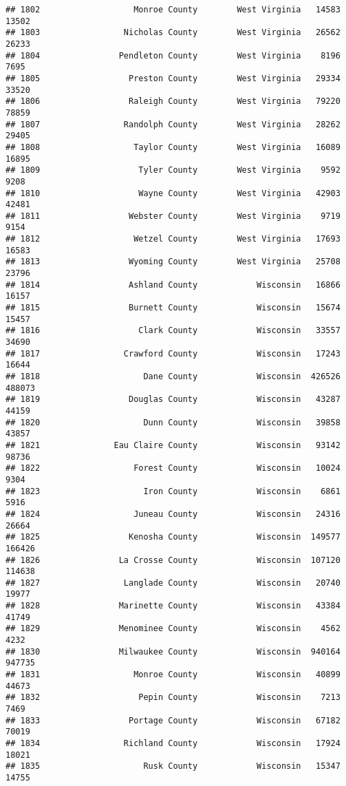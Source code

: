 \documentclass[
]{article}
\begin{document}
\begin{verbatim}
## 1802                   Monroe County        West Virginia   14583   13502
## 1803                 Nicholas County        West Virginia   26562   26233
## 1804                Pendleton County        West Virginia    8196    7695
## 1805                  Preston County        West Virginia   29334   33520
## 1806                  Raleigh County        West Virginia   79220   78859
## 1807                 Randolph County        West Virginia   28262   29405
## 1808                   Taylor County        West Virginia   16089   16895
## 1809                    Tyler County        West Virginia    9592    9208
## 1810                    Wayne County        West Virginia   42903   42481
## 1811                  Webster County        West Virginia    9719    9154
## 1812                   Wetzel County        West Virginia   17693   16583
## 1813                  Wyoming County        West Virginia   25708   23796
## 1814                  Ashland County            Wisconsin   16866   16157
## 1815                  Burnett County            Wisconsin   15674   15457
## 1816                    Clark County            Wisconsin   33557   34690
## 1817                 Crawford County            Wisconsin   17243   16644
## 1818                     Dane County            Wisconsin  426526  488073
## 1819                  Douglas County            Wisconsin   43287   44159
## 1820                     Dunn County            Wisconsin   39858   43857
## 1821               Eau Claire County            Wisconsin   93142   98736
## 1822                   Forest County            Wisconsin   10024    9304
## 1823                     Iron County            Wisconsin    6861    5916
## 1824                   Juneau County            Wisconsin   24316   26664
## 1825                  Kenosha County            Wisconsin  149577  166426
## 1826                La Crosse County            Wisconsin  107120  114638
## 1827                 Langlade County            Wisconsin   20740   19977
## 1828                Marinette County            Wisconsin   43384   41749
## 1829                Menominee County            Wisconsin    4562    4232
## 1830                Milwaukee County            Wisconsin  940164  947735
## 1831                   Monroe County            Wisconsin   40899   44673
## 1832                    Pepin County            Wisconsin    7213    7469
## 1833                  Portage County            Wisconsin   67182   70019
## 1834                 Richland County            Wisconsin   17924   18021
## 1835                     Rusk County            Wisconsin   15347   14755

\end{verbatim}
\end{document}

